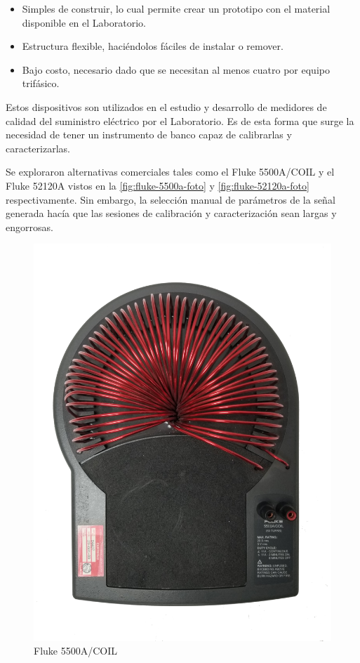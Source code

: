 \documentclass[../informe.tex]{subfiles}
\begin{document}
    \begin{itemize}
        \item Simples de construir, lo cual permite crear un prototipo con el material disponible en el Laboratorio.
        \item Estructura flexible, haciéndolos fáciles de instalar o remover.
        \item Bajo costo, necesario dado que se necesitan al menos cuatro por equipo trifásico.
    \end{itemize}

Estos dispositivos son utilizados en el estudio y desarrollo de medidores de calidad del suministro eléctrico por el Laboratorio. Es de esta forma que surge la necesidad de tener un instrumento de banco capaz de calibrarlas y caracterizarlas.

Se exploraron alternativas comerciales tales como el Fluke 5500A/COIL y el Fluke 52120A vistos en la \autoref{fig:fluke-5500a-foto} y \autoref{fig:fluke-52120a-foto} respectivamente. Sin embargo, la selección manual de parámetros de la señal generada hacía que las sesiones de calibración y caracterización sean largas y engorrosas.

    \begin{figure}[!htbp]
        \centering
        \includegraphics[scale=0.07]{images/fluke-5500a-foto.jpg}
        \caption{Fluke 5500A/COIL}
        \label{fig:fluke-5500a-foto}
    \end{figure}
\end{document}
